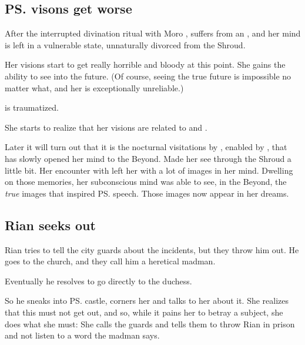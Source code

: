 \begin{garbage}
\subsection{\ps{\Tiroco} visons get worse}
After the interrupted divination ritual with Moro \Cornel, \Tiroco{} suffers from an , and her mind is left in a vulnerable state, unnaturally divorced from the Shroud. 

Her visions start to get really horrible and bloody at this point. She gains the ability to see into the future. (Of course, seeing the true future is impossible no matter what, and her  is exceptionally unreliable.)


\Tiroco{} is traumatized.

She starts to realize that her visions are related to \Icor{} and \Psyrex.

Later it will turn out that it is the nocturnal visitations by \Icor, enabled by \Psyrex, that has slowly opened her mind to the Beyond. 
Made her see through the Shroud a little bit. 
Her encounter with \Uswa{} left her with a lot of images in her mind. 
Dwelling on those memories, her subconscious mind was able to see, in the Beyond, the \emph{true} images that inspired \ps{\Uswa} speech. 
Those images now appear in her dreams. 







\subsection{Rian seeks out \Tiroco}
Rian tries to tell the city guards about the incidents, but they throw him out. He goes to the church, and they call him a heretical madman. 

Eventually he resolves to go directly to the duchess. 

So he sneaks into \ps{\Tiroco} castle, corners her and talks to her about it. 
She realizes that this must not get out, and so, while it pains her to betray a subject, she does what she must: She calls the guards and tells them to throw Rian in prison and not listen to a word the madman says. 


\end{garbage}
